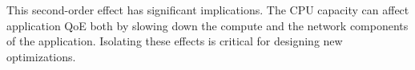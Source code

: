 This second-order effect has significant implications.  The CPU capacity can affect application QoE both by slowing down the compute and the network components of the application. Isolating these effects is critical for designing new optimizations.










